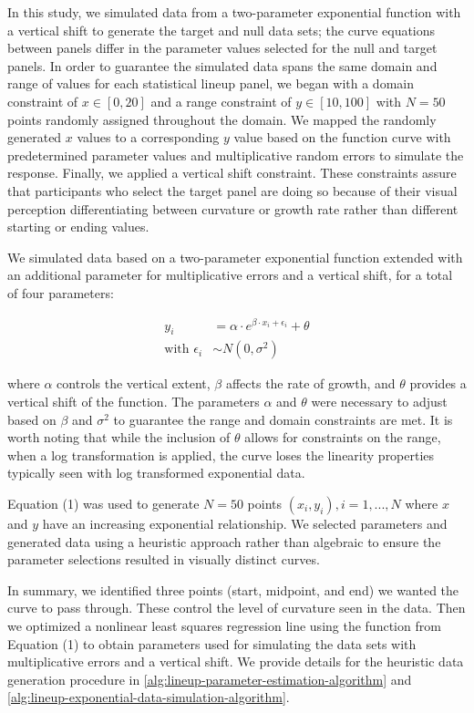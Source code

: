 \documentclass[12pt]{article}
\begin{document}
In this study, we simulated data from a two-parameter exponential
function with a vertical shift to generate the target and null data
sets; the curve equations between panels differ in the parameter values
selected for the null and target panels. In order to guarantee the
simulated data spans the same domain and range of values for each
statistical lineup panel, we began with a domain constraint of
\(x\in [0,20]\) and a range constraint of \(y\in [10,100]\) with
\(N = 50\) points randomly assigned throughout the domain. We mapped the
randomly generated \(x\) values to a corresponding \(y\) value based on
the function curve with predetermined parameter values and
multiplicative random errors to simulate the response. Finally, we
applied a vertical shift constraint. These constraints assure that
participants who select the target panel are doing so because of their
visual perception differentiating between curvature or growth rate
rather than different starting or ending values.

We simulated data based on a two-parameter exponential function extended
with an additional parameter for multiplicative errors and a vertical
shift, for a total of four parameters:

\begin{align}
y_i & = \alpha\cdot e^{\beta\cdot x_i + \epsilon_i} + \theta \\
\text{with } \epsilon_i & \sim N(0, \sigma^2) \nonumber
\end{align}

where \(\alpha\) controls the vertical extent, \(\beta\) affects the
rate of growth, and \(\theta\) provides a vertical shift of the
function. The parameters \(\alpha\) and \(\theta\) were necessary to
adjust based on \(\beta\) and \(\sigma^2\) to guarantee the range and
domain constraints are met. It is worth noting that while the inclusion
of \(\theta\) allows for constraints on the range, when a log
transformation is applied, the curve loses the linearity properties
typically seen with log transformed exponential data.

Equation (1) was used to generate \(N = 50\) points
\((x_i, y_i), i = 1,...,N\) where \(x\) and \(y\) have an increasing
exponential relationship. We selected parameters and generated data
using a heuristic approach rather than algebraic to ensure the parameter
selections resulted in visually distinct curves.

In summary, we identified three points (start, midpoint, and end) we
wanted the curve to pass through. These control the level of curvature
seen in the data. Then we optimized a nonlinear least squares regression
line using the function from Equation (1) to obtain parameters used for
simulating the data sets with multiplicative errors and a vertical
shift. We provide details for the heuristic data generation procedure in
\cref{alg:lineup-parameter-estimation-algorithm} and
\cref{alg:lineup-exponential-data-simulation-algorithm}.
\end{document}
